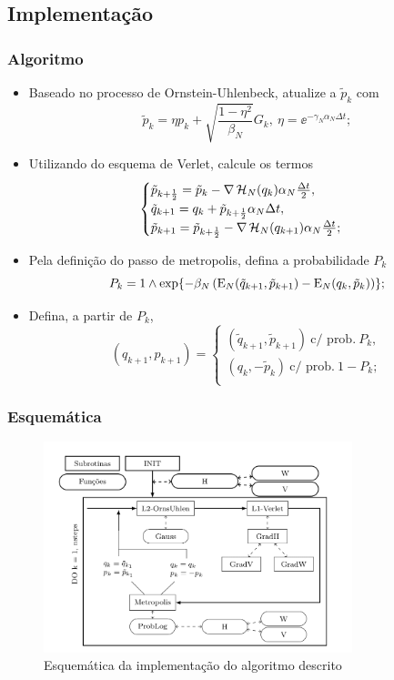 \subsection{Implementação}
\begin{frame}
	\frametitle{Algoritmo}
	
		\begin{itemize}		
			\item<1> Baseado no processo de Ornstein-Uhlenbeck, atualize a $\tilde{p}_k$ com
			$$
				\tilde{p}_k = \eta p_k + \sqrt{\frac{1-\eta^2}{\beta_N}} G_k, \ \eta = \ee^{-\gamma_N \alpha_N \Delta t};
				\label{Equation: Alg Mehler}
			$$
			\item<2> Utilizando do esquema de Verlet, calcule os termos
			$$
				\begin{cases}
					\tilde{p}_{k+\frac{1}{2}} = \tilde{p}_k - \nabla \operatorname{\mathcal{H}}_N(q_k) \alpha_N \frac{\Delta t}{2}, \\
					\tilde{q}_{k+1} = q_k + \tilde{p}_{k + \frac{1}{2}} \alpha_N \Delta t, \\
					\tilde{p}_{k+1} = \tilde{p}_{k+\frac{1}{2}} - \nabla \operatorname{\mathcal{H}}_N(q_{k+1}) \alpha_N \frac{\Delta t}{2};
					\label{Equation: Alg Verlet}
				\end{cases}
			$$
			\item<3> Pela definição do passo de metropolis, defina a probabilidade $P_k$
			$$
				P_k = 1 \wedge \exp{ -\beta_N \left(\operatorname{E}_N(\tilde{q}_{k+1}, \tilde{p}_{k+1}) - \operatorname{E}_N(q_{k}, \tilde{p}_{k}) \right)};
			$$
			\item<4> Defina, a partir de $P_k$, 
			$$
				(q_{k+1}, p_{k+1}) = 
				\begin{cases}
					(\tilde{q}_{k+1}, \tilde{p}_{k+1}) \ \text{c/ prob.} \ P_k, \\
					(q_k, -\tilde{p}_{k}) \ \text{c/ prob.} \ 1-P_k; \\
				\end{cases}
			$$
		\end{itemize}

\end{frame}
\begin{frame}
	\frametitle{Esquemática}
	\begin{figure}
		\centering
		\includegraphics[width=0.8\textwidth]{./media/Results/Esquematics}	
		\caption{Esquemática da implementação do algoritmo descrito}
	\end{figure}
\end{frame}
